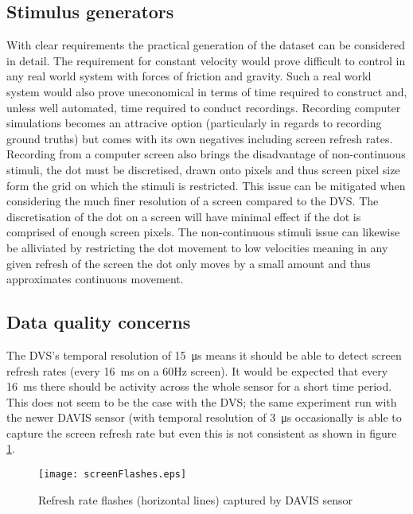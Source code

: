 \subsection{Stimulus generators}
With clear requirements the practical generation of the dataset can be considered in detail.
The requirement for constant velocity would prove difficult to control in any real world system with forces of friction and gravity.
Such a real world system would also prove uneconomical in terms of time required to construct and, unless well automated, time required to conduct recordings. 
Recording computer simulations becomes an attracive option (particularly in regards to recording ground truths) but comes with its own negatives including screen refresh rates.
Recording from a computer screen also brings the disadvantage of non-continuous stimuli, the dot must be discretised, drawn onto pixels and thus screen pixel size form the grid on which the stimuli is restricted. 
This issue can be mitigated when considering the much finer resolution of a screen compared to the DVS.
The discretisation of the dot on a screen will have minimal effect if the dot is comprised of enough screen pixels.
The non-continuous stimuli issue can likewise be alliviated by restricting the dot movement to low velocities meaning in any given refresh of the screen the dot only moves by a small amount and thus approximates continuous movement. 


\subsection{Data quality concerns}

The DVS's temporal resolution of \SI{15}{\micro\second} means it should be able to detect screen refresh rates (every \SI{16}{\milli\second} on a 60Hz screen). 
It would be expected that every \SI{16}{\milli\second} there should be activity across the whole sensor for a short time period. 
This does not seem to be the case with the DVS; the same experiment run with the newer DAVIS sensor (with temporal resolution of \SI{3}{\micro\second} occasionally is able to capture the screen refresh rate but even this is not consistent as shown in figure \ref{fig:refreshFlashes}.


\begin{figure}
    \centering
    \texttt{[image: screenFlashes.eps]}
    \caption{Refresh rate flashes (horizontal lines) captured by DAVIS sensor}
    \label{fig:refreshFlashes}
\end{figure}

